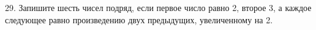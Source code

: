 29. Запишите шесть чисел подряд, если первое число равно 2, второе 3, а каждое следующее равно произведению двух предыдущих, увеличенному на 2.\\
